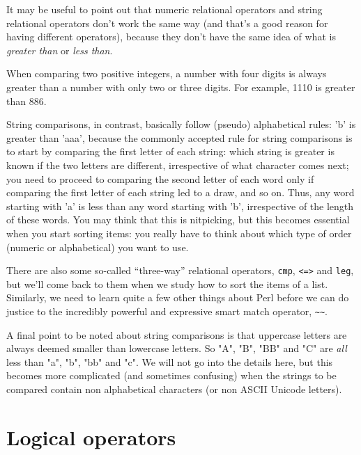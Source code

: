 It may be useful to point out that numeric relational operators 
and string relational operators don't work the same way (and 
that's a good reason for having different operators), because 
they don't have the same idea of what is \emph{greater than} 
or \emph{less than}.

When comparing two positive integers, a number with four digits
is always greater than a number with only two or three digits. 
For example, 1110 is greater than 886. 

String comparisons, in contrast, basically follow (pseudo) alphabetical rules: 'b' is greater than 'aaa', because the commonly accepted rule for string comparisons is to start by comparing the first letter of each string: which string is greater is known if the two letters are different, irrespective of what character comes next; you need to proceed to comparing the second letter of each word only if comparing the first letter of each string led to a draw, and so on. Thus, any word starting with 'a' is less than any word starting with 'b', irrespective of the length of these words. You may think that this is nitpicking, but this becomes essential when you start sorting items: you really have to think about which type of order (numeric or alphabetical) you want to use.

There are also some so-called ``three-way'' relational operators, 
{\tt cmp}, {\tt <=>} and {\tt leg}, but we'll come back to them 
when we study how to sort the items of a list. Similarly, we need 
to learn quite a few other things about Perl before we can do 
justice to the incredibly powerful and expressive smart match 
operator, \verb"~~".
\ifplastex \else
{}
\fi

A final point to be noted about string comparisons is 
that uppercase letters are always deemed smaller 
than lowercase letters. So "A", "B", "BB" and "C" 
are \emph{all} less than "a", "b", "bb" and "c". We 
will not go into the details here, but this becomes 
more complicated (and sometimes confusing) when 
the strings to be compared contain non alphabetical 
characters (or non ASCII Unicode letters).

\section{Logical operators}

